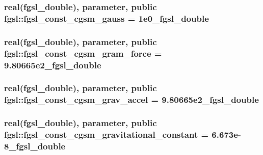 \subsubsection[{fgsl\+\_\+const\+\_\+cgsm\+\_\+gauss}]{\setlength{\rightskip}{0pt plus 5cm}real({\bf fgsl\+\_\+double}), parameter, public fgsl\+::fgsl\+\_\+const\+\_\+cgsm\+\_\+gauss = 1e0\+\_\+fgsl\+\_\+double}\label{namespacefgsl_af917fb04d607724208d74a65a71644fe}
\hypertarget{namespacefgsl_a1ba32b331b50764a4e448e8020526104}{}
\subsubsection[{fgsl\+\_\+const\+\_\+cgsm\+\_\+gram\+\_\+force}]{\setlength{\rightskip}{0pt plus 5cm}real({\bf fgsl\+\_\+double}), parameter, public fgsl\+::fgsl\+\_\+const\+\_\+cgsm\+\_\+gram\+\_\+force = 9.\+80665e2\+\_\+fgsl\+\_\+double}\label{namespacefgsl_a1ba32b331b50764a4e448e8020526104}
\hypertarget{namespacefgsl_abcdb6fe4c8e314d2d05ee14a854357fd}{}
\subsubsection[{fgsl\+\_\+const\+\_\+cgsm\+\_\+grav\+\_\+accel}]{\setlength{\rightskip}{0pt plus 5cm}real({\bf fgsl\+\_\+double}), parameter, public fgsl\+::fgsl\+\_\+const\+\_\+cgsm\+\_\+grav\+\_\+accel = 9.\+80665e2\+\_\+fgsl\+\_\+double}\label{namespacefgsl_abcdb6fe4c8e314d2d05ee14a854357fd}
\hypertarget{namespacefgsl_a9f255e9dfccd5852a1229344cadc48ba}{}
\subsubsection[{fgsl\+\_\+const\+\_\+cgsm\+\_\+gravitational\+\_\+constant}]{\setlength{\rightskip}{0pt plus 5cm}real({\bf fgsl\+\_\+double}), parameter, public fgsl\+::fgsl\+\_\+const\+\_\+cgsm\+\_\+gravitational\+\_\+constant = 6.\+673e-\/8\+\_\+fgsl\+\_\+double}\label{namespacefgsl_a9f255e9dfccd5852a1229344cadc48ba}
\hypertarget{namespacefgsl_a4d19d597ffc77fc0c1aa577276cab117}{}
